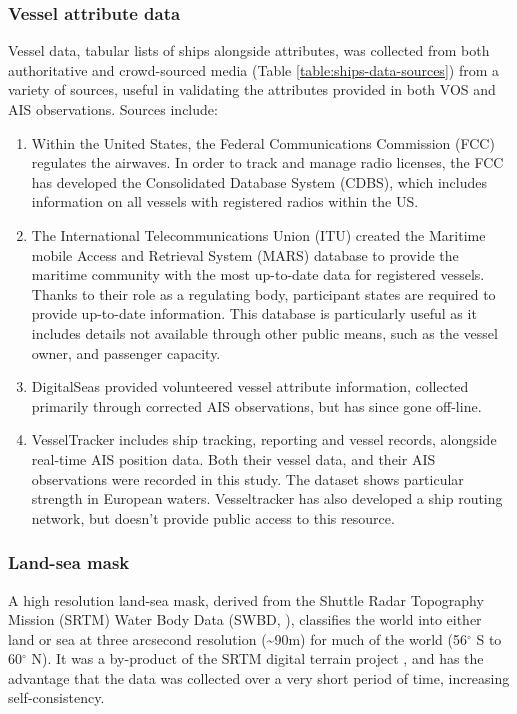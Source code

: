 \documentclass[12pt,letterpaper]{article}
\begin{document}
\subsubsection{Vessel attribute data}
Vessel data, tabular lists of ships alongside attributes, was collected from both authoritative and crowd-sourced media (Table \ref{table:ships-data-sources}) from a variety of sources, useful in validating the attributes provided in both VOS and AIS observations. Sources include:
\begin{enumerate}
  \item Within the United States, the Federal Communications Commission (FCC) regulates the airwaves. In order to track and manage radio licenses, the FCC has developed the Consolidated Database System (CDBS), which includes information on all vessels with registered radios within the US. 
  \item The International Telecommunications Union (ITU) created the Maritime mobile Access and Retrieval System (MARS) database to provide the maritime community with the most up-to-date data for registered vessels. Thanks to their role as a regulating body, participant states are required to provide up-to-date information. This database is particularly useful as it includes details not available through other public means, such as the vessel owner, and passenger capacity.
  \item DigitalSeas provided volunteered vessel attribute information, collected primarily through corrected AIS observations, but has since gone off-line.
  \item VesselTracker includes ship tracking, reporting and vessel records, alongside real-time AIS position data. Both their vessel data, and their AIS observations were recorded in this study. The dataset shows particular strength in European waters. Vesseltracker has also developed a ship routing network, but doesn't provide public access to this resource.
\end{enumerate}

\subsubsection{Land-sea mask}
\label{sec:land-sea-mask}
  A high resolution land-sea mask, derived from the Shuttle Radar Topography Mission (SRTM) Water Body Data (SWBD, \citealp{slater2006srtm}), classifies the world into either land or sea at three arcsecond resolution (\textasciitilde{}90m) for much of the world (56$^\circ$ S to 60$^\circ$ N). It was a by-product of the SRTM digital terrain project \citep{rabus2003shuttle}, and has the advantage that the data was collected over a very short period of time, increasing self-consistency.
\end{document}
